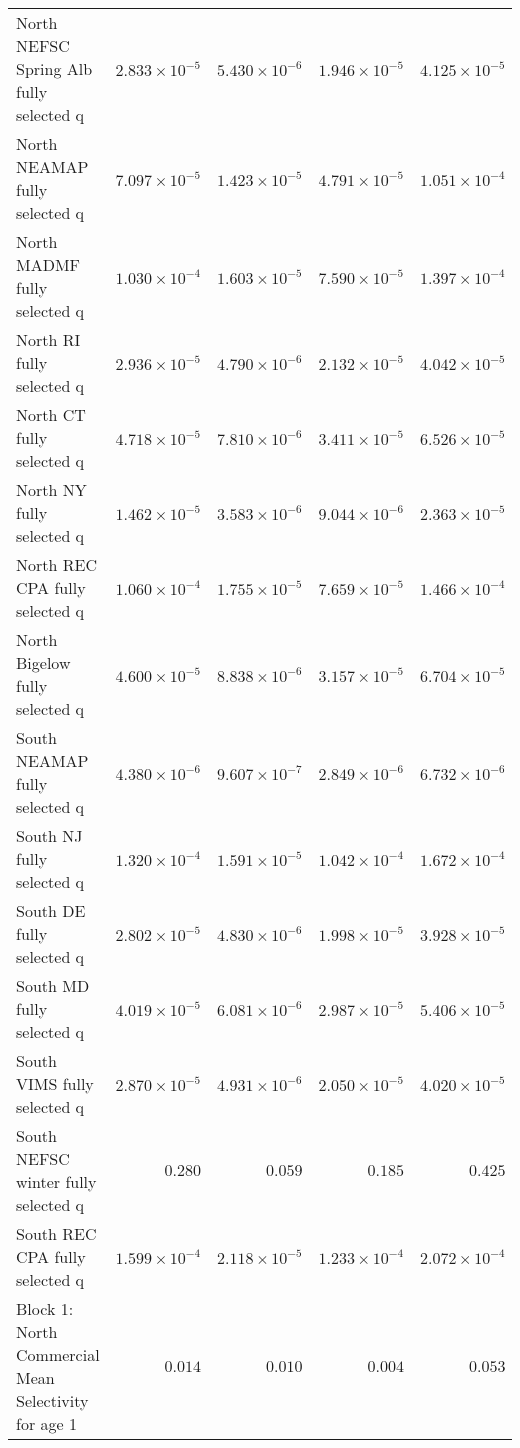 \documentclass[
]{article}
\begin{document}
\begin{landscape}
\begin{longtable}[t]{lrrrr}
\addlinespace
North NEFSC Spring Alb fully selected q & $2.833\times 10^{-5}$ & $5.430\times 10^{-6}$ & $1.946\times 10^{-5}$ & $4.125\times 10^{-5}$\\
North NEAMAP fully selected q & $7.097\times 10^{-5}$ & $1.423\times 10^{-5}$ & $4.791\times 10^{-5}$ & $1.051\times 10^{-4}$\\
North MADMF fully selected q & $1.030\times 10^{-4}$ & $1.603\times 10^{-5}$ & $7.590\times 10^{-5}$ & $1.397\times 10^{-4}$\\
North RI fully selected q & $2.936\times 10^{-5}$ & $4.790\times 10^{-6}$ & $2.132\times 10^{-5}$ & $4.042\times 10^{-5}$\\
North CT fully selected q & $4.718\times 10^{-5}$ & $7.810\times 10^{-6}$ & $3.411\times 10^{-5}$ & $6.526\times 10^{-5}$\\
\addlinespace
North NY fully selected q & $1.462\times 10^{-5}$ & $3.583\times 10^{-6}$ & $9.044\times 10^{-6}$ & $2.363\times 10^{-5}$\\
North REC CPA fully selected q & $1.060\times 10^{-4}$ & $1.755\times 10^{-5}$ & $7.659\times 10^{-5}$ & $1.466\times 10^{-4}$\\
North Bigelow fully selected q & $4.600\times 10^{-5}$ & $8.838\times 10^{-6}$ & $3.157\times 10^{-5}$ & $6.704\times 10^{-5}$\\
South NEAMAP fully selected q & $4.380\times 10^{-6}$ & $9.607\times 10^{-7}$ & $2.849\times 10^{-6}$ & $6.732\times 10^{-6}$\\
South NJ fully selected q & $1.320\times 10^{-4}$ & $1.591\times 10^{-5}$ & $1.042\times 10^{-4}$ & $1.672\times 10^{-4}$\\
\addlinespace
South DE fully selected q & $2.802\times 10^{-5}$ & $4.830\times 10^{-6}$ & $1.998\times 10^{-5}$ & $3.928\times 10^{-5}$\\
South MD fully selected q & $4.019\times 10^{-5}$ & $6.081\times 10^{-6}$ & $2.987\times 10^{-5}$ & $5.406\times 10^{-5}$\\
South VIMS fully selected q & $2.870\times 10^{-5}$ & $4.931\times 10^{-6}$ & $2.050\times 10^{-5}$ & $4.020\times 10^{-5}$\\
South NEFSC winter fully selected q & $0.280$ & $0.059$ & $0.185$ & $0.425$\\
South REC CPA fully selected q & $1.599\times 10^{-4}$ & $2.118\times 10^{-5}$ & $1.233\times 10^{-4}$ & $2.072\times 10^{-4}$\\
\addlinespace
Block 1: North Commercial Mean Selectivity for age 1 & $0.014$ & $0.010$ & $0.004$ & $0.053$\\

\end{longtable}
\end{landscape}
\end{document}
